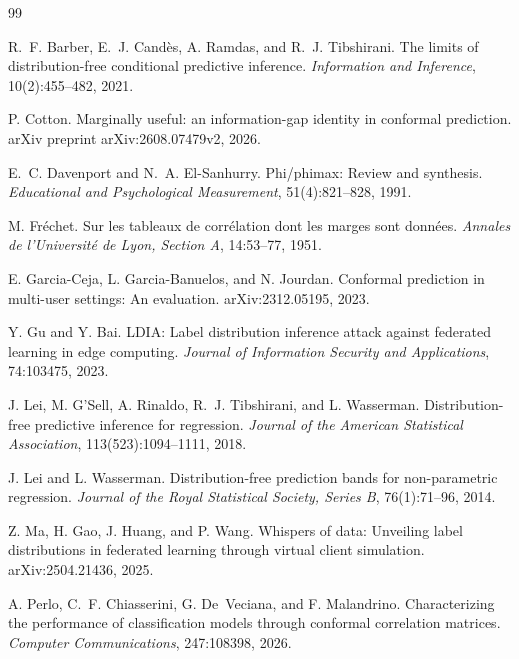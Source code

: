 \documentclass[11pt]{article}
\theoremstyle{definition}
\theoremstyle{definition}
\theoremstyle{remark}
\begin{document}
\begin{thebibliography}{99}

R.~F. Barber, E.~J. Cand\`es, A. Ramdas, and R.~J. Tibshirani.
\newblock The limits of distribution-free conditional predictive inference.
\newblock \emph{Information and Inference}, 10(2):455--482, 2021.

P. Cotton.
\newblock Marginally useful: an information-gap identity in conformal prediction.
\newblock arXiv preprint arXiv:2608.07479v2, 2026.

E.~C. Davenport and N.~A. El-Sanhurry.
\newblock Phi/phimax: Review and synthesis.
\newblock \emph{Educational and Psychological Measurement}, 51(4):821--828, 1991.

M. Fr\'echet.
\newblock Sur les tableaux de corr\'elation dont les marges sont donn\'ees.
\newblock \emph{Annales de l'Universit\'e de Lyon, Section A}, 14:53--77, 1951.

E. Garcia-Ceja, L. Garcia-Banuelos, and N. Jourdan.
\newblock Conformal prediction in multi-user settings: An evaluation.
\newblock arXiv:2312.05195, 2023.

Y. Gu and Y. Bai.
\newblock LDIA: Label distribution inference attack against federated learning in edge computing.
\newblock \emph{Journal of Information Security and Applications}, 74:103475, 2023.

J. Lei, M. G'Sell, A. Rinaldo, R.~J. Tibshirani, and L. Wasserman.
\newblock Distribution-free predictive inference for regression.
\newblock \emph{Journal of the American Statistical Association}, 113(523):1094--1111, 2018.

J. Lei and L. Wasserman.
\newblock Distribution-free prediction bands for non-parametric regression.
\newblock \emph{Journal of the Royal Statistical Society, Series B}, 76(1):71--96, 2014.

Z. Ma, H. Gao, J. Huang, and P. Wang.
\newblock Whispers of data: Unveiling label distributions in federated learning through virtual
client simulation.
\newblock arXiv:2504.21436, 2025.

A. Perlo, C.~F. Chiasserini, G. De~Veciana, and F. Malandrino.
\newblock Characterizing the performance of classification models through conformal correlation
matrices.
\newblock \emph{Computer Communications}, 247:108398, 2026.


\end{thebibliography}
\end{document}

